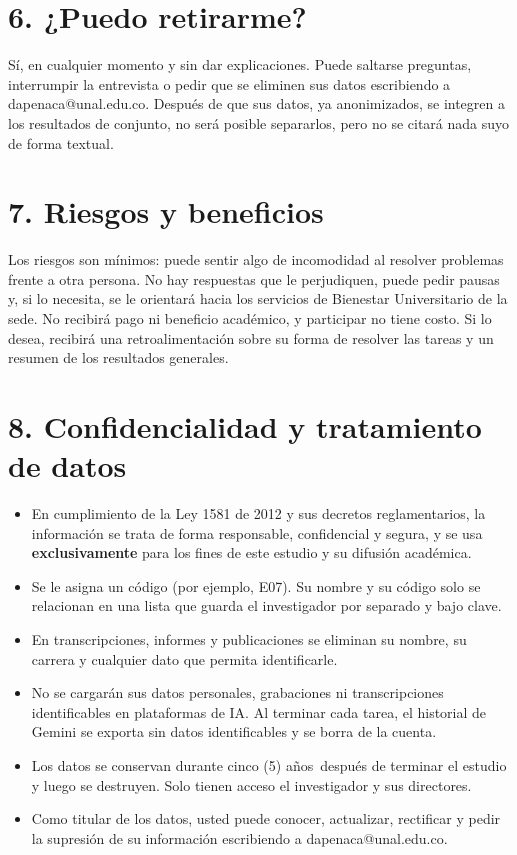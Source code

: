 \documentclass[11pt,letterpaper]{article}
\makeatletter
\newcommand{\CorreoInv}{dapenaca@unal.edu.co}
\newcommand{\Conservacion}{cinco (5) años}
\makeatother
\begin{document}
\section*{6. ¿Puedo retirarme?}
Sí, en cualquier momento y sin dar explicaciones. Puede saltarse preguntas, interrumpir la entrevista o pedir que se eliminen sus datos escribiendo a \CorreoInv. Después de que sus datos, ya anonimizados, se integren a los resultados de conjunto, no será posible separarlos, pero no se citará nada suyo de forma textual.

\section*{7. Riesgos y beneficios}
Los riesgos son mínimos: puede sentir algo de incomodidad al resolver problemas frente a otra persona. No hay respuestas que le perjudiquen, puede pedir pausas y, si lo necesita, se le orientará hacia los servicios de Bienestar Universitario de la sede. No recibirá pago ni beneficio académico, y participar no tiene costo. Si lo desea, recibirá una retroalimentación sobre su forma de resolver las tareas y un resumen de los resultados generales.

\section*{8. Confidencialidad y tratamiento de datos}
\begin{itemize}
  \item En cumplimiento de la Ley 1581 de 2012 y sus decretos reglamentarios, la información se trata de forma responsable, confidencial y segura, y se usa \textbf{exclusivamente} para los fines de este estudio y su difusión académica.
  \item Se le asigna un código (por ejemplo, E07). Su nombre y su código solo se relacionan en una lista que guarda el investigador por separado y bajo clave.
  \item En transcripciones, informes y publicaciones se eliminan su nombre, su carrera y cualquier dato que permita identificarle.
  \item No se cargarán sus datos personales, grabaciones ni transcripciones identificables en plataformas de IA. Al terminar cada tarea, el historial de Gemini se exporta sin datos identificables y se borra de la cuenta.
  \item Los datos se conservan durante \Conservacion\ después de terminar el estudio y luego se destruyen. Solo tienen acceso el investigador y sus directores.
  \item Como titular de los datos, usted puede conocer, actualizar, rectificar y pedir la supresión de su información escribiendo a \CorreoInv.
\end{itemize}
\end{document}
